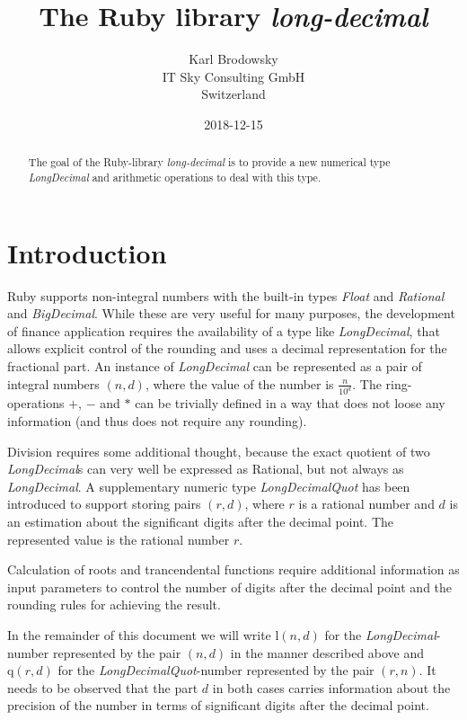 \documentclass[10pt,a4paper]{article}
\title{The Ruby library {\slshape long-decimal}}
\author{Karl Brodowsky\\
IT Sky Consulting GmbH\\
Switzerland}
\date{2018-12-15}
\def\ld{\mathrm l}
\def\ldq{\mathrm q}
\begin{document}
\sffamily
\maketitle

\begin{abstract}

The goal of the Ruby-library {\slshape long-decimal}\/ is to provide a new
numerical type {\slshape LongDecimal\/}\/ and arithmetic operations to deal
with this type.

\end{abstract}

\section{Introduction}

Ruby supports non-integral numbers with the built-in types {\slshape
  Float\/} and {\slshape Rational\/} and {\slshape BigDecimal\/}.
While these are very useful for many purposes, the development of
finance application requires the availability of a type like
{\slshape LongDecimal\/}, that allows explicit control of the rounding and uses a
decimal representation for the fractional part.  An instance of
{\slshape LongDecimal\/} can be represented as a pair of integral
numbers $(n, d)$, where the value of the number is $\frac{n}{10^d}$.
The ring-operations $+$, $-$ and $*$ can be trivially defined in a way
that does not loose any information (and thus does not require any
rounding).

Division requires some additional thought, because the exact quotient
of two {\slshape LongDecimal\/}s can very well be expressed as
Rational, but not always as {\slshape LongDecimal\/}.  A supplementary
numeric type {\slshape LongDecimalQuot\/} has been introduced to
support storing pairs $(r, d)$, where $r$ is a rational number and $d$
is an estimation about the significant digits after the decimal point.
The represented value is the rational number $r$.

Calculation of roots and trancendental functions require additional
information as input parameters to control the number of digits after
the decimal point and the rounding rules for achieving the result.

In the remainder of this document we will write $\ld(n, d)$ for the
{\slshape LongDecimal\/}-number represented by the pair $(n, d)$ in
the manner described above and $\ldq(r, d)$ for the {\slshape
  LongDecimalQuot\/}-number represented by the pair $(r, n)$.  It
needs to be observed that the part $d$ in both cases carries
information about the precision of the number in terms of significant
digits after the decimal point.
\end{document}
